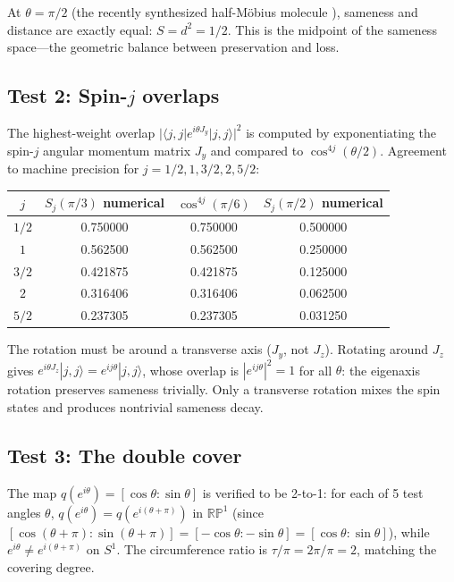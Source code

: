 \documentclass[11pt,letterpaper]{article}
\begin{document}
At $\theta = \pi/2$ (the recently synthesized half-M\"obius molecule \cite{ibm2026}), sameness and distance are exactly equal: $S = d^2 = 1/2$. This is the midpoint of the sameness space---the geometric balance between preservation and loss.

\subsection{Test 2: Spin-$j$ overlaps}

The highest-weight overlap $|\langle j,j|e^{i\theta J_y}|j,j\rangle|^2$ is computed by exponentiating the spin-$j$ angular momentum matrix $J_y$ and compared to $\cos^{4j}(\theta/2)$. Agreement to machine precision for $j = 1/2, 1, 3/2, 2, 5/2$:

\begin{center}
\begin{tabular}{cccc}
\toprule
$j$ & $S_j(\pi/3)$ numerical & $\cos^{4j}(\pi/6)$ & $S_j(\pi/2)$ numerical \\
\midrule
$1/2$ & 0.750000 & 0.750000 & 0.500000 \\
$1$ & 0.562500 & 0.562500 & 0.250000 \\
$3/2$ & 0.421875 & 0.421875 & 0.125000 \\
$2$ & 0.316406 & 0.316406 & 0.062500 \\
$5/2$ & 0.237305 & 0.237305 & 0.031250 \\
\bottomrule
\end{tabular}
\end{center}

The rotation must be around a transverse axis ($J_y$, not $J_z$). Rotating around $J_z$ gives $e^{i\theta J_z}|j,j\rangle = e^{ij\theta}|j,j\rangle$, whose overlap is $|e^{ij\theta}|^2 = 1$ for all $\theta$: the eigenaxis rotation preserves sameness trivially. Only a transverse rotation mixes the spin states and produces nontrivial sameness decay.

\subsection{Test 3: The double cover}

The map $q(e^{i\theta}) = [\cos\theta : \sin\theta]$ is verified to be 2-to-1: for each of 5 test angles $\theta$, $q(e^{i\theta}) = q(e^{i(\theta+\pi)})$ in $\mathbb{RP}^1$ (since $[\cos(\theta+\pi) : \sin(\theta+\pi)] = [-\cos\theta : -\sin\theta] = [\cos\theta : \sin\theta]$), while $e^{i\theta} \neq e^{i(\theta+\pi)}$ on $S^1$. The circumference ratio is $\tau/\pi = 2\pi/\pi = 2$, matching the covering degree.
\end{document}
